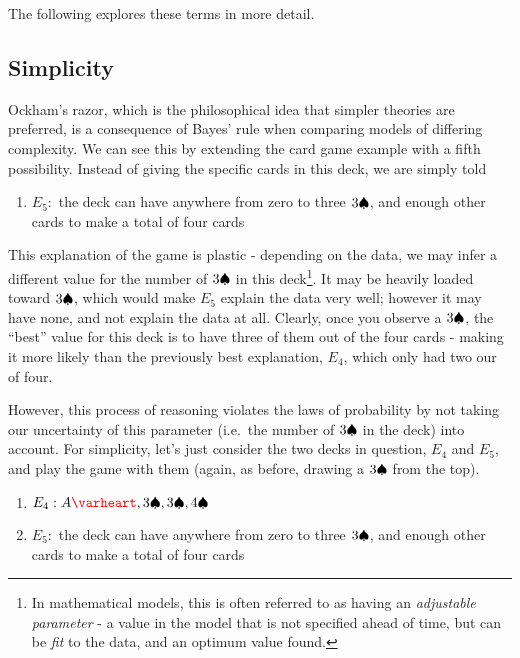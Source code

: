 \documentclass{tufte-book}
\begin{document}
The following explores these terms in more detail.

\subsection{Simplicity}\label{simplicity}

Ockham's razor, which is the philosophical idea that simpler theories
are preferred, is a consequence of Bayes' rule when comparing models of
differing complexity\citep{jefferys1991sharpening}. We can see this by
extending the card game example with a fifth possibility. Instead of
giving the specific cards in this deck, we are simply told

\begin{enumerate}
\def\labelenumi{\arabic{enumi}.}
\itemsep1pt\parskip0pt
\item
  \(E_5:\) the deck can have anywhere from zero to three \(3\spadesuit\),
  and enough other cards to make a total of four cards
\end{enumerate}

This explanation of the game is plastic - depending on the data, we may
infer a different value for the number of \(3\spadesuit\) in this
deck\footnote{In mathematical models, this is often referred to as
  having an \emph{adjustable parameter} - a value in the model that is
  not specified ahead of time, but can be \emph{fit} to the data, and an
  optimum value found.}. It may be heavily loaded toward \(3\spadesuit\),
which would make \(E_{5}\) explain the data very well; however it may
have none, and not explain the data at all. Clearly, once you observe a
\(3\spadesuit\), the ``best'' value for this deck is to have three of them
out of the four cards - making it more likely than the previously best
explanation, \(E_4\), which only had two our of four.

However, this process of reasoning violates the laws of probability by
not taking our uncertainty of this parameter (i.e.~the number of
\(3\spadesuit\) in the deck) into account. For simplicity, let's just
consider the two decks in question, \(E_4\) and \(E_5\), and play the
game with them (again, as before, drawing a \(3\spadesuit\) from the top).

\begin{enumerate}
\def\labelenumi{\arabic{enumi}.}
\itemsep1pt\parskip0pt
\item
  \(E_4: A\hearts,3\spades, 3\spades, 4\spades\)
\item
  \(E_5:\) the deck can have anywhere from zero to three \(3\spadesuit\),
  and enough other cards to make a total of four cards
\end{enumerate}
\end{document}
